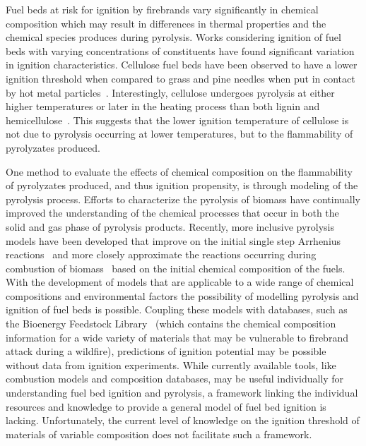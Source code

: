     Fuel beds at risk for ignition by firebrands vary significantly in chemical composition which may result in differences in thermal properties and the chemical species produces during pyrolysis. Works considering ignition of fuel beds with varying concentrations of constituents have found significant variation in ignition characteristics. Cellulose fuel beds have been observed to have a lower ignition threshold when compared to grass and pine needles when put in contact by hot metal particles~\cite{Urban2018}. Interestingly, cellulose undergoes pyrolysis at either higher temperatures or later in the heating process than both lignin and hemicellulose~\cite{Yang2007a, Shotorban2018}. This suggests that the lower ignition temperature of cellulose is not due to pyrolysis occurring at lower temperatures, but to the flammability of pyrolyzates produced. 
    
    One method to evaluate the effects of chemical composition on the flammability of pyrolyzates produced, and thus ignition propensity, is through modeling of the pyrolysis process. Efforts to characterize the pyrolysis of biomass have continually improved the understanding of the chemical processes that occur in both the solid and gas phase of pyrolysis products. Recently, more inclusive pyrolysis models have been developed that improve on the initial single step Arrhenius reactions~\cite{DIBLASI199371} and more closely approximate the reactions occurring during combustion of biomass~\cite{Ranzi2008, Debiagi2015, Dhahak2019} based on the initial chemical composition of the fuels. With the development of models that are applicable to a wide range of chemical compositions and environmental factors the possibility of modelling pyrolysis and ignition of fuel beds is possible. Coupling these models with databases, such as the Bioenergy Feedstock Library~\cite{feedstock} (which contains the chemical composition information for a wide variety of materials that may be vulnerable to firebrand attack during a wildfire), predictions of ignition potential may be possible without data from ignition experiments. While currently available tools, like combustion models and composition databases, may be useful individually for understanding fuel bed ignition and pyrolysis, a framework linking the individual resources and knowledge to provide a general model of fuel bed ignition is lacking. Unfortunately, the current level of knowledge on the ignition threshold of materials of variable composition does not facilitate such a framework.
    
